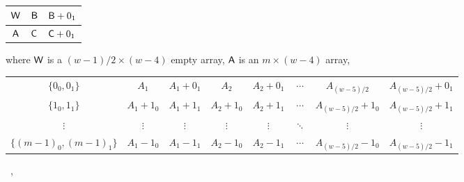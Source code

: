 \documentclass[draft, 11pt]{article}
\begin{document}
 \begin{figure}

\renewcommand{\arraystretch}{2}
\setlength{\tabcolsep}{5pt} \centering

\begin{tabular}{|c|c|c|}
\hline
${\sf W}$	& ${\sf B}$  & ${\sf B}+0_1$     \\\hline
{${\sf A}$}    & ${\sf C}$  & ${\sf C}+0_1$     \\ \hline
\end{tabular}
\vskip 5pt

\flushleft where ${\sf W}$ is a $(w-1)/2\times (w-4)$ empty array, ${\sf A}$ is an $m\times (w-4)$ array,
\vskip 5pt
\renewcommand{\arraystretch}{1.2}
\setlength{\tabcolsep}{1pt} 
\centering \small
\begin{tabular}{|c|ccccccc|}
\hline
$\{0_0,0_1\}$ 			& $A_{1}$ & $A_1+0_1$		& $A_{2}$ & $A_{2}+0_1$ & $\cdots$  			
& $A_{(w-5)/2}$ &  $A_{(w-5)/2}+0_1$\\
$\{1_0,1_1\}$ 			& $A_{1}+1_0$ & $A_1+1_1$ 	& $A_{2}+1_0$ & $A_{2}+1_1$ & $\cdots$  
& $A_{(w-5)/2}+1_0$ & $A_{(w-5)/2}+1_1$\\
$\vdots$ 				& $\vdots$ & $\vdots$			& $\vdots$ & $\vdots$ & $\ddots$ 		
& $\vdots$ & $\vdots$ \\
$\{(m-1)_0,(m-1)_1\}$ 	& $A_{1}-1_0$ & $A_{1}-1_1$ 	& $A_{2}-1_0$ & $A_{2}-1_1$ & $\cdots$   
 & $A_{(w-5)/2}-1_0$ & $A_{(w-5)/2}-1_1$\\
\hline
\end{tabular}\ ,


\end{figure}
\end{document}
